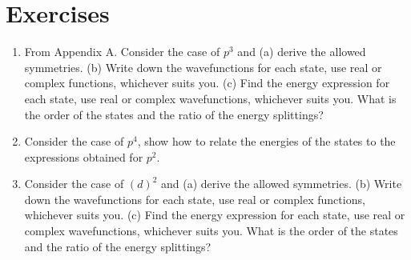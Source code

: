 \section{Exercises}
\begin{enumerate}
\item From Appendix A.  Consider the case of $p^3$ and (a) derive 
the allowed symmetries.  (b) Write down the wavefunctions for each 
state, use real or complex functions, whichever suits you.  (c) Find 
the energy expression for each state, use real or complex 
wavefunctions, whichever suits you.  What is the order of the states 
and the ratio of the energy splittings?

\item Consider the case of $p^4$, show how to relate the energies 
of the states to the expressions obtained for $p^2$.

\item Consider the case of $(d)^2$ and (a) derive the allowed 
symmetries.  (b) Write down the wavefunctions for each state, use real 
or complex functions, whichever suits you.  (c) Find the energy 
expression for each state, use real or complex wavefunctions, 
whichever suits you.  What is the order of the states and the ratio of 
the energy splittings?
\end{enumerate}
